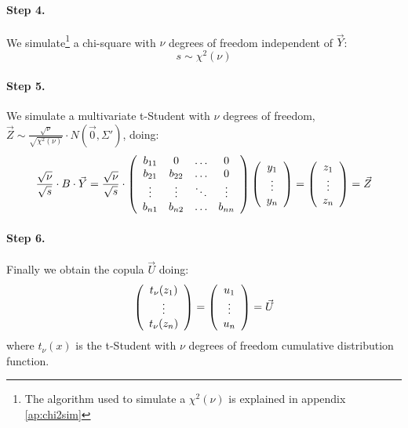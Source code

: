 \documentclass[a4paper,12pt,final]{article}
\begin{document}
\paragraph{Step 4.} We simulate\footnote{The algorithm used to simulate a $\chi^2(\nu)$
is explained in appendix \ref{ap:chi2sim}} a chi-square with $\nu$ degrees of freedom 
independent of $\vec{Y}$:
\begin{displaymath}
s \sim \chi^2(\nu)
\end{displaymath}

\paragraph{Step 5.} We simulate a multivariate t-Student with $\nu$ degrees of freedom, 
$\vec{Z} \sim \frac{\sqrt{\nu}}{\sqrt{\chi^2(\nu)}} \cdot N(\vec{0}, \Sigma')$, doing:
\begin{displaymath}
\frac{\sqrt{\nu}}{\sqrt{s}} \cdot B \cdot \vec{Y} 
=
\frac{\sqrt{\nu}}{\sqrt{s}} \cdot 
\left(
\begin{array}{cccc}
b_{11}   & 0        & \ldots & 0       \cr
b_{21}   & b_{22}   & \ldots & 0       \cr
\vdots  & \vdots  & \ddots & \vdots \cr
b_{n1}   & b_{n2}   & \ldots & b_{nn}
\end{array}
\right)
\left(
\begin{array}{c}
y_1 \cr
\vdots \cr
y_n
\end{array}
\right) 
=
\left(
\begin{array}{c}
z_1 \cr
\vdots \cr
z_n
\end{array}
\right) 
= 
\vec{Z}
\end{displaymath}

\paragraph{Step 6.} Finally we obtain the copula $\vec{U}$ doing:
\begin{displaymath}
\left(
\begin{array}{c}
t_\nu(z_1) \cr
\vdots \cr
t_\nu(z_n)
\end{array}
\right) 
=
\left(
\begin{array}{c}
u_1 \cr
\vdots \cr
u_n
\end{array}
\right) 
=
\vec{U} 
\end{displaymath}
where $t_\nu(x)$ is the t-Student with $\nu$ degrees of freedom cumulative distribution 
function.

\end{document}
